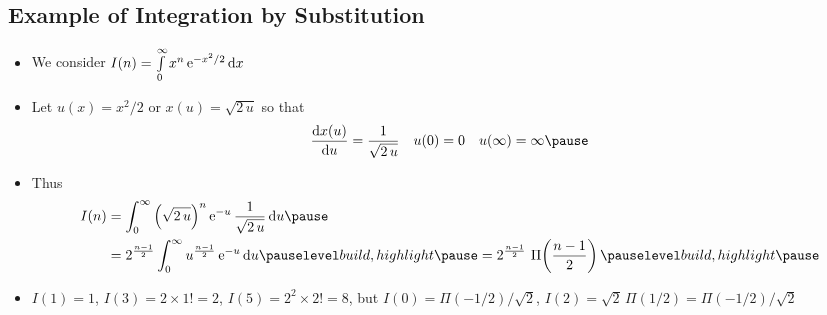 \begin{slide}
\section[-2]{Example of Integration by Substitution}

\begin{PauseHighLight}
  \begin{itemize}
  \item We consider $I(n) = \int\limits_0^\infty x^n\, {\rm e}^{-x^2/2} \, \mathrm{d} x$\pause
  \item Let $u(x) =x^2/2$ or $x(u) = \sqrt{2\,u}$ so that
    \begin{align*}
      \frac{\dd x(u)}{\dd u} &= \frac{1}{\sqrt{2\,u}} & u(0)&=0 & u(\infty)
                                                            = \infty\pause
    \end{align*}
  \item Thus
    \begin{align*}
      I(n) &= \int_0^\infty \bra{\sqrt{2\,u}}^{n}\e{-u}\, \frac{1}{\sqrt{2\,u}} \, 
      \dd u\pause\\
      &= 2^{\frac{n-1}{2}} \int_0^\infty  u^{\frac{n-1}{2}} \, \e{-u}\,
      \dd u \pauseb = 2^{\frac{n-1}{2}}\,\, \Pi\!\bra{\frac{n-1}{2}}\pauseb
    \end{align*}
  \item $I(1) = 1$\pauseb, $I(3)=2\times1!=2$\pauseb,
    $I(5)=2^2\times2!=8$\pauseb, but $I(0)=
    \Pi(-1/2)/\sqrt{2}$\pauseb, $I(2)= \sqrt{2}\,\Pi(1/2)=
    \Pi(-1/2)/\sqrt{2}$\pauseb
  \end{itemize}
\end{PauseHighLight}

\end{slide}

